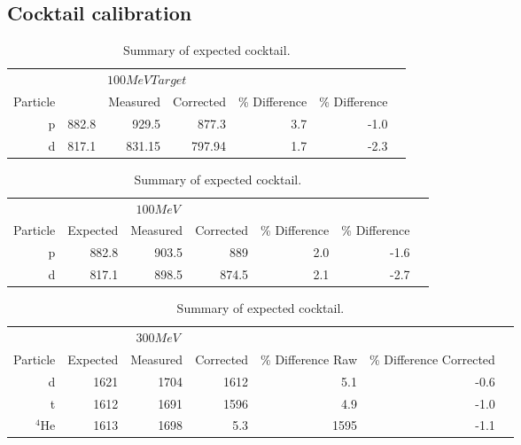 
\subsection{Cocktail calibration}

\begin{table*}\centering
{}
\begin{tabular}{@{}rrrrrrr@{}}\toprule
& \multicolumn{3}{c}{$100 MeV Target$}\\
\cmidrule{2-4}
Particle &\phantom{abc} & Measured & Corrected & \% Difference & \% Difference\\
\midrule
p   & 882.8 & 929.5 & 877.3   &  3.7  & -1.0  \\
d   & 817.1 & 831.15 & 797.94 &  1.7  & -2.3\\
\bottomrule
\end{tabular}
\caption{Summary of expected cocktail. }
\label{tb:cocktail100tar}
\end{table*}

\begin{table*}\centering
{}
\begin{tabular}{@{}rrrrrrr@{}}\toprule
& \multicolumn{3}{c}{$100 MeV$}\\
\cmidrule{2-4}
Particle & Expected & Measured & Corrected & \% Difference & \% Difference\\
\midrule
p   & 882.8 & 903.5 & 889   &  2.0   & -1.6  \\
d   & 817.1 & 898.5 & 874.5 &  2.1   & -2.7\\
\bottomrule
\end{tabular}
\caption{Summary of expected cocktail. }
\label{tb:cocktail100}
\end{table*}

\begin{table*}\centering
{}
\begin{tabular}{@{}rrrrrrr@{}}\toprule
& \multicolumn{3}{c}{$300 MeV$}\\
\cmidrule{2-4}
Particle & Expected & Measured & Corrected & \% Difference Raw & \% Difference Corrected\\
\midrule
d   & 1621 & 1704 & 1612   &  5.1 & -0.6  \\
t   & 1612 & 1691 & 1596   &  4.9  & -1.0\\
${}^{4}$He   & 1613 & 1698 &  5.3 & 1595  & -1.1\\

\bottomrule
\end{tabular}
\caption{Summary of expected cocktail. }
\label{tb:cocktail300}
\end{table*}

